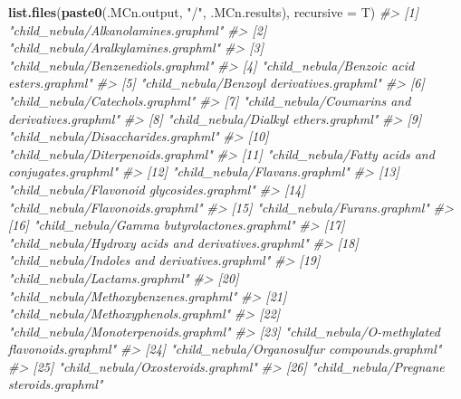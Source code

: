 \documentclass[]{tufte-handout}
\newenvironment{Shaded}{}{}
\newcommand{\CommentTok}[1]{\textcolor[rgb]{0.38,0.63,0.69}{\textit{#1}}}
\newcommand{\DataTypeTok}[1]{\textcolor[rgb]{0.56,0.13,0.00}{#1}}
\newcommand{\KeywordTok}[1]{\textcolor[rgb]{0.00,0.44,0.13}{\textbf{#1}}}
\newcommand{\NormalTok}[1]{#1}
\newcommand{\StringTok}[1]{\textcolor[rgb]{0.25,0.44,0.63}{#1}}
\begin{document}
\begin{Shaded}
\begin{Highlighting}[]
\KeywordTok{list.files}\NormalTok{(}\KeywordTok{paste0}\NormalTok{(.MCn.output, }\StringTok{"/"}\NormalTok{, .MCn.results), }\DataTypeTok{recursive =}\NormalTok{ T)}
\CommentTok{\#\textgreater{}  [1] "child\_nebula/Alkanolamines.graphml"                   }
\CommentTok{\#\textgreater{}  [2] "child\_nebula/Aralkylamines.graphml"                   }
\CommentTok{\#\textgreater{}  [3] "child\_nebula/Benzenediols.graphml"                    }
\CommentTok{\#\textgreater{}  [4] "child\_nebula/Benzoic acid esters.graphml"             }
\CommentTok{\#\textgreater{}  [5] "child\_nebula/Benzoyl derivatives.graphml"             }
\CommentTok{\#\textgreater{}  [6] "child\_nebula/Catechols.graphml"                       }
\CommentTok{\#\textgreater{}  [7] "child\_nebula/Coumarins and derivatives.graphml"       }
\CommentTok{\#\textgreater{}  [8] "child\_nebula/Dialkyl ethers.graphml"                  }
\CommentTok{\#\textgreater{}  [9] "child\_nebula/Disaccharides.graphml"                   }
\CommentTok{\#\textgreater{} [10] "child\_nebula/Diterpenoids.graphml"                    }
\CommentTok{\#\textgreater{} [11] "child\_nebula/Fatty acids and conjugates.graphml"      }
\CommentTok{\#\textgreater{} [12] "child\_nebula/Flavans.graphml"                         }
\CommentTok{\#\textgreater{} [13] "child\_nebula/Flavonoid glycosides.graphml"            }
\CommentTok{\#\textgreater{} [14] "child\_nebula/Flavonoids.graphml"                      }
\CommentTok{\#\textgreater{} [15] "child\_nebula/Furans.graphml"                          }
\CommentTok{\#\textgreater{} [16] "child\_nebula/Gamma butyrolactones.graphml"            }
\CommentTok{\#\textgreater{} [17] "child\_nebula/Hydroxy acids and derivatives.graphml"   }
\CommentTok{\#\textgreater{} [18] "child\_nebula/Indoles and derivatives.graphml"         }
\CommentTok{\#\textgreater{} [19] "child\_nebula/Lactams.graphml"                         }
\CommentTok{\#\textgreater{} [20] "child\_nebula/Methoxybenzenes.graphml"                 }
\CommentTok{\#\textgreater{} [21] "child\_nebula/Methoxyphenols.graphml"                  }
\CommentTok{\#\textgreater{} [22] "child\_nebula/Monoterpenoids.graphml"                  }
\CommentTok{\#\textgreater{} [23] "child\_nebula/O{-}methylated flavonoids.graphml"         }
\CommentTok{\#\textgreater{} [24] "child\_nebula/Organosulfur compounds.graphml"          }
\CommentTok{\#\textgreater{} [25] "child\_nebula/Oxosteroids.graphml"                     }
\CommentTok{\#\textgreater{} [26] "child\_nebula/Pregnane steroids.graphml"               }

\end{Highlighting}
\end{Shaded}
\end{document}

